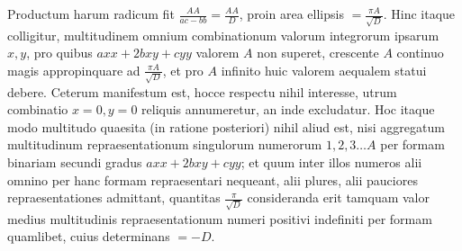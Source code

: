 Productum harum radicum fit $\frac{AA}{ac-bb}=\frac{AA}D$, proin area ellipsis $=\frac{\pi A}{\surd D}$. Hinc itaque colligitur, multitudinem omnium combinationum valorum integrorum ipsarum $x,y$, pro quibus $axx+2bxy+cyy$ valorem $A$ non superet, crescente $A$ continuo magis appropinquare ad $\frac{\pi A}{\surd D}$, et pro $A$ infinito huic valorem aequalem statui debere. Ceterum manifestum est, hocce respectu nihil interesse, utrum combinatio $x=0,y=0$ reliquis annumeretur, an inde excludatur. Hoc itaque modo multitudo quaesita (in ratione posteriori) nihil aliud est, nisi aggregatum multitudinum repraesentationum singulorum numerorum $1,2,3\ldots A$ per formam binariam secundi gradus $axx+2bxy+cyy$; et quum inter illos numeros alii omnino per hanc formam repraesentari nequeant, alii plures, alii pauciores repraesentationes admittant, quantitas $\frac\pi{\surd D}$ consideranda erit tamquam valor medius multitudinis repraesentationum numeri positivi indefiniti per formam quamlibet, cuius determinans $=-D$.


